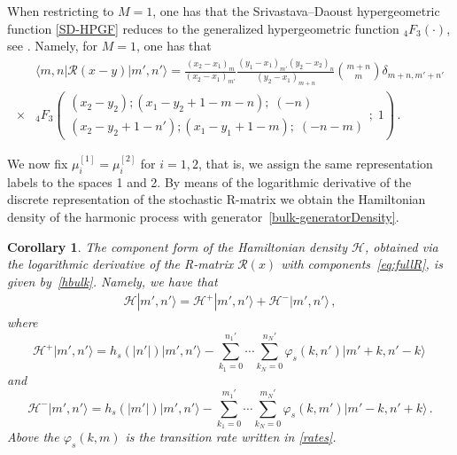 \documentclass[11pt]{article}
\numberwithin{equation}{section}
\newtheorem{corollary}[theorem]{Corollary}
\newcommand{\M}{M}
\newcommand{\eR}{\mathcal{R}}
\newcommand{\eH}{\mathcal{H}}
\begin{document}
When restricting to $\M=1$, one has that the Srivastava–Daoust hypergeometric function \eqref{SD-HPGF} reduces to the generalized hypergeometric function ${}_4F_3\left(\cdot
\right)$, see \cite{Mangazeev:2014gwa}. Namely, for $\M=1$, one has that 
\begin{equation}
    \begin{split}
        &\langle m,n|  {\eR}(x-y) |m',n'\rangle =\frac{(x_2-x_1)_{m} }{(x_2-x_1)_{m'}}\frac{(y_1-x_1)_{m'}(y_2-x_2)_{n}}{(y_2-x_1)_{m+n}} \binom{m+n}{m} \delta_{m+n,m'+n'}
    \\\times & 
    {}_4F_3\left(
\begin{matrix}
(x_{2}-y_{2});(x_{1}-y_{2}+1-m-n);\;(-n)\\
(x_{2}-y_{2}+1-n'); (x_{1}-y_{1}+1-m);\;(-n-m)
\end{matrix};\; 1
 \right)\,.
    \end{split}
\end{equation}


 
We now fix $\mu_{i}^{[1]}=\mu_{i}^{[2]}$ for $i=1,2$, that is, we assign the same representation labels to the spaces 1 and 2. By means of the logarithmic derivative of the discrete representation of the stochastic R-matrix we obtain the Hamiltonian density of the harmonic process with generator~\eqref{bulk-generatorDensity}. \begin{corollary}\label{corollary-bulk-elements}
The component form of the Hamiltonian density $\eH$, obtained via the logarithmic derivative of the R-matrix $\eR(x)$ with components~\eqref{eq:fullR}, is given by~\eqref{hbulk}. Namely, we have that 
\begin{equation}
\label{ham-discrete}
\begin{split}
 \eH|m',n'\rangle=\eH^{+}|m',n'\rangle+\eH^{-}|m',n'\rangle\,,
  \end{split}
\end{equation}
where
\begin{equation}
    \eH^{+}|m',n'\rangle=h_s(|n'|)|m',n'\rangle-\sum_{k_{1}=0}^{n_{1}'}\cdots \sum_{k_{N}=0}^{n_{N}'}\varphi_{s}(k,n') |m'+k,n'-k\rangle\,
\end{equation}
and \begin{equation}
    \eH^{-}|m',n'\rangle=h_s(|m'|)|m',n'\rangle-\sum_{k_{1}=0}^{m_{1}'}\cdots \sum_{k_{N}=0}^{m_{N}'}\varphi_{s}(k,m') |m'-k,n'+k\rangle\,.
\end{equation}
Above the $\varphi_{s}(k,m)$ is the transition rate written in \eqref{rates}. 

 \end{corollary}
\end{document}

